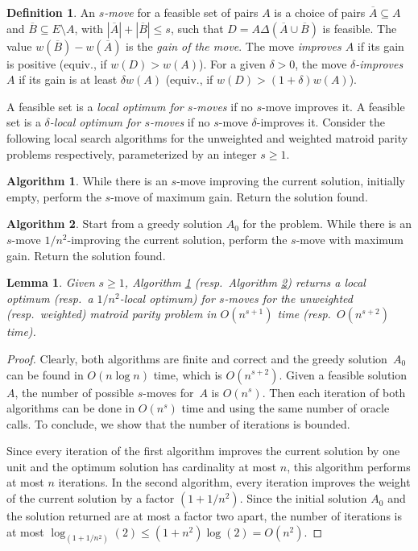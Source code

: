 \documentclass[letterpaper,11pt]{article}
\newtheorem{lemma}[theorem]{Lemma}
\theoremstyle{definition}
\newtheorem{definition}[theorem]{Definition}
\newtheorem{alg}{Algorithm}
\begin{document}
\begin{definition} An \emph{$s$-move} for a feasible set of pairs $A$ is a choice of pairs $\overline{A} \subseteq A$ and $\overline{B} \subseteq E\setminus A$, with $|\overline{A}|+|\overline{B}|\leq s$, such that  $D=A \Delta (\overline{A} \cup \overline{B})$ is feasible. The value $w(\overline{B})-w(\overline{A})$ is the \emph{gain of the move}. The move \emph{improves $A$} if its gain is positive (equiv., if $w(D) > w(A)$). For a given $\delta>0$, the move \emph{$\delta$-improves $A$} if its gain is at least $\delta w(A)$ (equiv., if $w(D) > (1+\delta)w(A)$).
\end{definition}

A feasible set is a \emph{local optimum for $s$-moves} if no $s$-move improves it. A feasible set is a \emph{$\delta$-local optimum for $s$-moves} if no $s$-move $\delta$-improves it. Consider the following local search algorithms for the unweighted and weighted matroid parity problems respectively, parameterized by an integer $s\geq 1$.

\begin{alg} \label{alg1} While there is an $s$-move improving the current solution, initially empty, perform the $s$-move of maximum gain. Return the solution found.
\end{alg}

\begin{alg} \label{alg2} Start from a greedy solution $A_0$ for the problem. While there is an $s$-move $1/n^2$-improving the current solution, perform the $s$-move with maximum gain. Return the solution found.
\end{alg}
\begin{lemma}\label{lem:localoptimum}
Given $s \geq 1$, Algorithm \ref{alg1} (resp.\ Algorithm \ref{alg2}) returns a local optimum (resp.\ a $1/n^2$-local optimum) for $s$-moves for the unweighted (resp.\ weighted) matroid parity problem in $O(n^{s+1})$ time (resp.\ $O(n^{s+2})$ time).
\end{lemma}
\begin{proof}
Clearly, both algorithms are finite and correct and the greedy solution~$A_0$ can be found in $O(n
\log n)$ time, which is $O(n^{s+2})$. Given a feasible solution $A$, the number of possible $s$-moves for~$A$ is $O(n^{s})$. Then each iteration of both algorithms can be done in $O(n^{s})$ time and using the same number of oracle calls. To conclude, we show that the number of iterations is bounded.

Since every iteration of the first algorithm improves the current solution by one unit and the optimum solution has cardinality at most $n$, this algorithm performs at most $n$ iterations. In the second algorithm, every iteration improves the weight of the current solution by a factor $(1+1/n^2)$. Since the initial solution $A_0$ and the solution returned are at most a factor two apart, the number of iterations is at most $\log_{(1+1/n^2)}(2) \leq (1+n^2)\log(2)=O(n^2)$. \qedhere
\end{proof}
\end{document}
